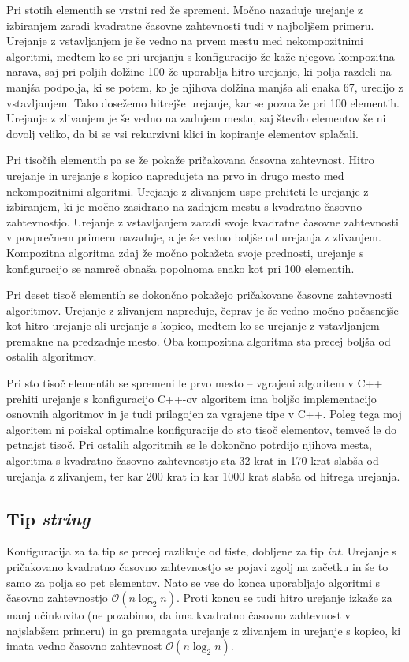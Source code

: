\documentclass[a4paper,oneside,12pt]{article}
\begin{document}
Pri stotih elementih se vrstni red že spremeni. Močno nazaduje urejanje z izbiranjem zaradi 
kvadratne časovne zahtevnosti tudi v najboljšem primeru. Urejanje z vstavljanjem je še vedno 
na prvem mestu med nekompozitnimi algoritmi, medtem ko se pri urejanju s konfiguracijo že kaže njegova
kompozitna narava, saj pri poljih dolžine 100 že uporablja hitro urejanje, ki polja razdeli na 
manjša podpolja, ki se potem, ko je njihova dolžina manjša ali enaka 67, uredijo z vstavljanjem.
Tako dosežemo hitrejše urejanje, kar se pozna že pri 100 elementih. Urejanje z zlivanjem je še 
vedno na zadnjem mestu, saj število elementov še ni dovolj veliko, da bi se vsi rekurzivni klici 
in kopiranje elementov splačali.

Pri tisočih elementih pa se že pokaže pričakovana časovna zahtevnost. Hitro urejanje in urejanje
s kopico napredujeta na prvo in drugo mesto med nekompozitnimi algoritmi. Urejanje z zlivanjem uspe 
prehiteti le urejanje z izbiranjem, ki je močno zasidrano na zadnjem mestu s kvadratno časovno 
zahtevnostjo. Urejanje z vstavljanjem zaradi svoje kvadratne časovne zahtevnosti v povprečnem 
primeru nazaduje, a je še vedno boljše od urejanja z zlivanjem.
Kompozitna algoritma zdaj že močno pokažeta svoje prednosti, urejanje s konfiguracijo se namreč 
obnaša popolnoma enako kot pri 100 elementih.

Pri deset tisoč elementih se dokončno pokažejo pričakovane časovne zahtevnosti algoritmov.
Urejanje z zlivanjem napreduje, čeprav je še vedno močno počasnejše kot hitro urejanje ali
urejanje s kopico, medtem ko se urejanje z vstavljanjem premakne na predzadnje 
mesto. Oba kompozitna algoritma sta precej boljša od ostalih algoritmov.

Pri sto tisoč elementih se spremeni le prvo mesto -- vgrajeni algoritem v C++ prehiti urejanje s konfiguracijo 
C++-ov algoritem ima boljšo implementacijo osnovnih algoritmov in je tudi
prilagojen za vgrajene tipe v C++. Poleg tega moj algoritem ni poiskal optimalne 
konfiguracije do sto tisoč elementov, temveč le do petnajst tisoč. Pri ostalih algoritmih se 
le dokončno potrdijo njihova mesta, algoritma s kvadratno časovno zahtevnostjo sta 32 krat
in 170 krat slabša od urejanja z zlivanjem, ter kar 200 krat in kar 1000 krat slabša od hitrega 
urejanja.

\subsection{Tip \emph{string}}

Konfiguracija za ta tip se precej razlikuje od tiste, dobljene za tip \emph{int}. Urejanje
s pričakovano kvadratno časovno zahtevnostjo se pojavi zgolj na začetku in še to samo za 
polja so pet elementov. Nato se vse do konca uporabljajo algoritmi s časovno zahtevnostjo 
$\mathcal{O}(n\log_2n)$. Proti koncu se tudi hitro urejanje izkaže za manj učinkovito (ne 
pozabimo, da ima kvadratno časovno zahtevnost v najslabšem primeru) in ga premagata urejanje
z zlivanjem in urejanje s kopico, ki imata vedno časovno zahtevnost $\mathcal{O}(n\log_2n)$. 
\end{document}
